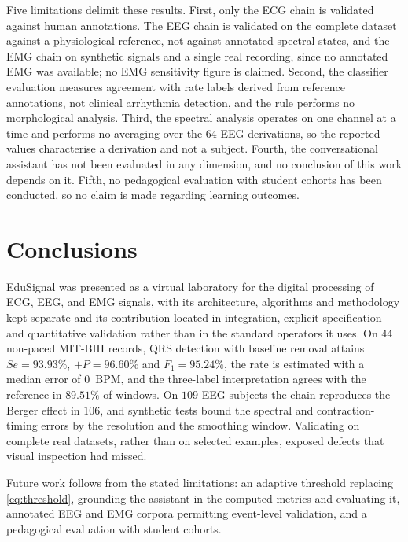 \documentclass[conference]{IEEEtran}
\begin{document}
Five limitations delimit these results. First, only the ECG chain is validated against human annotations. The EEG chain is validated on the complete dataset against a physiological reference, not against annotated spectral states, and the EMG chain on synthetic signals and a single real recording, since no annotated EMG was available; no EMG sensitivity figure is claimed. Second, the classifier evaluation measures agreement with rate labels derived from reference annotations, not clinical arrhythmia detection, and the rule performs no morphological analysis. Third, the spectral analysis operates on one channel at a time and performs no averaging over the 64 EEG derivations, so the reported values characterise a derivation and not a subject. Fourth, the conversational assistant has not been evaluated in any dimension, and no conclusion of this work depends on it. Fifth, no pedagogical evaluation with student cohorts has been conducted, so no claim is made regarding learning outcomes.

\section{Conclusions}

EduSignal was presented as a virtual laboratory for the digital processing of ECG, EEG, and EMG signals, with its architecture, algorithms and methodology kept separate and its contribution located in integration, explicit specification and quantitative validation rather than in the standard operators it uses. On 44 non-paced MIT-BIH records, QRS detection with baseline removal attains $Se=93.93\%$, $+P=96.60\%$ and $F_1=95.24\%$, the rate is estimated with a median error of $0$~BPM, and the three-label interpretation agrees with the reference in $89.51\%$ of windows. On $109$ EEG subjects the chain reproduces the Berger effect in $106$, and synthetic tests bound the spectral and contraction-timing errors by the resolution and the smoothing window. Validating on complete real datasets, rather than on selected examples, exposed defects that visual inspection had missed.

Future work follows from the stated limitations: an adaptive threshold replacing \eqref{eq:threshold}, grounding the assistant in the computed metrics and evaluating it, annotated EEG and EMG corpora permitting event-level validation, and a pedagogical evaluation with student cohorts.






\vspace{12pt}
\end{document}
